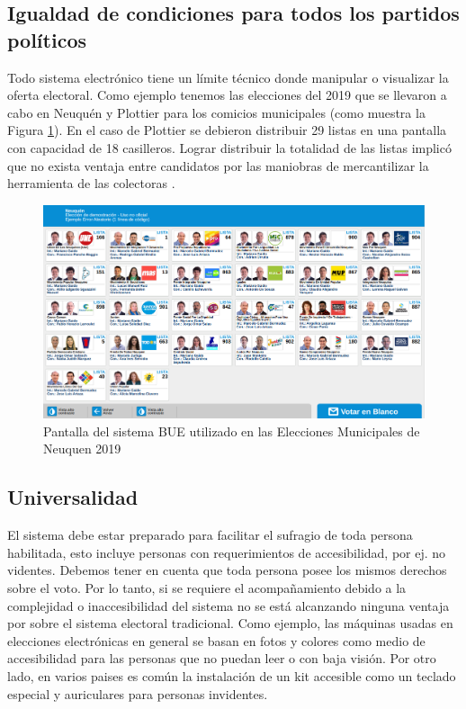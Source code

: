 \subsection{Igualdad de condiciones para todos los partidos políticos}
Todo sistema electrónico tiene un límite técnico donde manipular o visualizar la oferta electoral. Como ejemplo tenemos las elecciones del 2019 que se llevaron a cabo en Neuquén y Plottier para los comicios municipales (como muestra la Figura \ref{graf:buenqn}). En el caso de Plottier se debieron distribuir 29 listas en una pantalla con capacidad de 18 casilleros. Lograr distribuir la totalidad de las listas implicó que no exista ventaja entre candidatos por las maniobras de mercantilizar la herramienta de las colectoras \cite{limiteColectoras}.

\begin{figure}[h!]
    \begin{center}
        \includegraphics[width=\textwidth]{img/buenqn2019.png}
    \end{center}
  \caption{Pantalla del sistema BUE utilizado en las Elecciones Municipales de Neuquen 2019}
  \label{graf:buenqn}
\end{figure}

\subsection{Universalidad}
El sistema debe estar preparado para facilitar el sufragio de toda persona habilitada, esto incluye personas con requerimientos de accesibilidad, por ej. no videntes. Debemos tener en cuenta que toda persona posee los mismos derechos sobre el voto. Por lo tanto, si se requiere el acompañamiento debido a la complejidad o inaccesibilidad del sistema no se está alcanzando ninguna ventaja por sobre el sistema electoral tradicional.\newline
Como ejemplo, las máquinas usadas en elecciones electrónicas en general se basan en fotos y colores como medio de accesibilidad para las personas que no puedan leer o con baja visión. Por otro lado, en varios paises es común la instalación de un kit accesible como un teclado especial y auriculares para personas invidentes.

